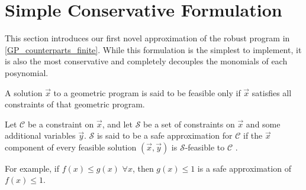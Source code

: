 \section{Simple Conservative Formulation} \label{Conservative}
This section introduces our first novel approximation of the robust program in \eqref{GP_counterparts_finite}. While this formulation is the simplest to implement, it is also the most conservative and completely decouples the monomials of each posynomial.

\theoremstyle{definition}
\begin{definition}
A solution $\vec{x}$ to a geometric program is said to be feasible only if $\vec{x}$ satisfies all constraints of that geometric program.
\end{definition}

\begin{definition}
Let $\mathcal{C}$ be a constraint on $\vec{x}$, and let $\mathcal{S}$ be a set of constraints on $\vec{x}$ and some additional variables $\vec{y}$. $\mathcal{S}$ is said to be a safe approximation for $\mathcal{C}$ if the $\vec{x}$ component of every feasible solution $\left(\vec{x},\vec{y}\right)$ is $\mathcal{S}$-feasible to $\mathcal{C}$ \cite{ben-tal_ghaoui_nemirovski_2009}.
\end{definition}
For example, if $f\left(x\right) \leq g\left(x\right)$ $\forall x$, then $g\left(x\right) \leq 1$ is a safe approximation of $f\left(x\right) \leq 1$.

